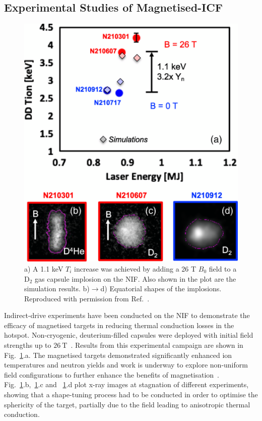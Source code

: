 \subsection{Experimental Studies of Magnetised-ICF}%
\label{sec:Res2_magicf_prevwork}

\begin{figure}[t!]
    \includegraphics[width=0.5\linewidth]{Results2/Images/magnif_yield_inc.png}
    \centering
    \caption{a) A 1.1 keV $T_i$ increase was achieved by adding a 26 T $B_0$ field to a D${}_{2}$ gas capsule implosion on the \ac{NIF}.
    Also shown in the plot are the simulation results.
    b)$\rightarrow$d) Equatorial shapes of the implosions.
    Reproduced with permission from Ref.~\cite{moody_increased_2022}.}%
    \label{fig:Res2_moody_magnif}
\end{figure}

Indirect-drive experiments have been conducted on the \ac{NIF} to demonstrate the efficacy of magnetised targets in reducing thermal conduction losses in the hotspot.
Non-cryogenic, deuterium-filled capsules were deployed with initial field strengths up to $26\ \text{T}$~\cite{moody_increased_2022}.
Results from this experimental campaign are shown in Fig.~\ref{fig:Res2_moody_magnif}.a.
The magnetised targets demonstrated significantly enhanced ion temperatures and neutron yields and work is underway to explore non-uniform field configurations to further enhance the benefits of magnetisation~\cite{walsh_application_2023}.
Fig.~\ref{fig:Res2_moody_magnif}.b,~\ref{fig:Res2_moody_magnif}.c and ~\ref{fig:Res2_moody_magnif}.d plot x-ray images at stagnation of different experiments, showing that a shape-tuning process had to be conducted in order to optimise the sphericity of the target, partially due to the field leading to anisotropic thermal conduction.

